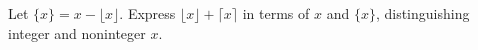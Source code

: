 Let $\{x\}=x-\lfloor x\rfloor$. Express $\lfloor x\rfloor+\lceil x\rceil$ in terms of $x$ and $\{x\}$, distinguishing integer and noninteger $x$.
